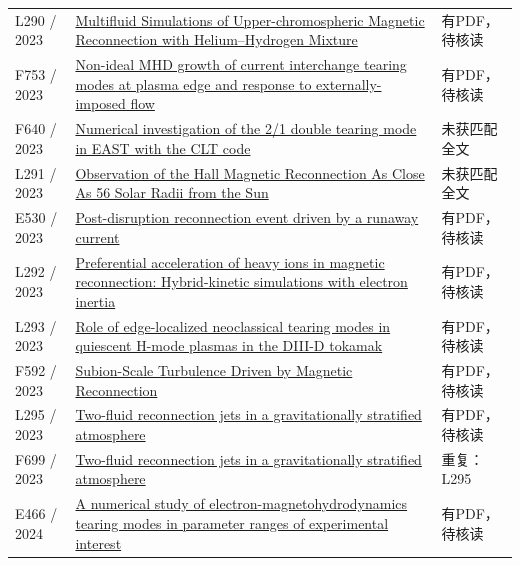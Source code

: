 \begin{longtable}{P{24mm}P{97mm}P{27mm}}
L290 / 2023 & \href{https://doi.org/10.3847/1538-4357/acbfb1}{Multifluid Simulations of Upper-chromospheric Magnetic Reconnection with Helium–Hydrogen Mixture} & 有PDF，待核读\\

F753 / 2023 & \href{https://doi.org/10.1063/5.0106785}{Non-ideal MHD growth of current interchange tearing modes at plasma edge and response to externally-imposed flow} & 有PDF，待核读\\

F640 / 2023 & \href{https://doi.org/10.1063/5.0159182}{Numerical investigation of the 2/1 double tearing mode in EAST with the CLT code} & 未获匹配全文\\

L291 / 2023 & \href{https://doi.org/10.3847/1538-4357/acbdf6}{Observation of the Hall Magnetic Reconnection As Close As 56 Solar Radii from the Sun} & 未获匹配全文\\

E530 / 2023 & \href{https://doi.org/10.1063/5.0174167}{Post-disruption reconnection event driven by a runaway current} & 有PDF，待核读\\

L292 / 2023 & \href{https://doi.org/10.48550/arxiv.2307.13268}{Preferential acceleration of heavy ions in magnetic reconnection: Hybrid-kinetic simulations with electron inertia} & 有PDF，待核读\\

L293 / 2023 & \href{https://doi.org/10.1063/5.0137123}{Role of edge-localized neoclassical tearing modes in quiescent H-mode plasmas in the DIII-D tokamak} & 有PDF，待核读\\

F592 / 2023 & \href{https://doi.org/10.1103/physrevlett.130.205201}{Subion-Scale Turbulence Driven by Magnetic Reconnection} & 有PDF，待核读\\

L295 / 2023 & \href{https://doi.org/10.1051/0004-6361/202346659}{Two-fluid reconnection jets in a gravitationally stratified atmosphere} & 有PDF，待核读\\

F699 / 2023 & \href{https://doi.org/10.48550/arxiv.2307.05736}{Two-fluid reconnection jets in a gravitationally stratified atmosphere} & 重复：L295\\

E466 / 2024 & \href{https://doi.org/10.1063/5.0205061}{A numerical study of electron-magnetohydrodynamics tearing modes in parameter ranges of experimental interest} & 有PDF，待核读\\


\end{longtable}
